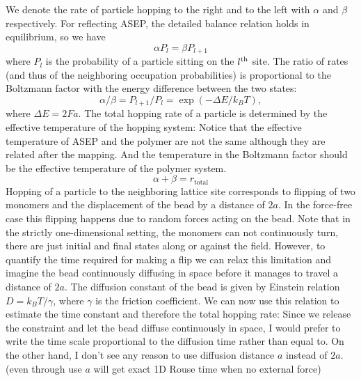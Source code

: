 \documentclass[aps,showpacs,twocolumn,floatfix,prx,superscriptaddress]{revtex4-1}
\begin{document}
We denote the rate of particle hopping to the right and to the left with $\alpha$ and $\beta$ respectively. For reflecting ASEP, the detailed balance relation holds in equilibrium, so we have 
\begin{equation}
    \alpha P_{l} = \beta P_{l+1} \label{eq:db}
\end{equation}
where $P_{l}$ is the probability of a particle sitting on the $l^{\rm{th}}$ site. The ratio of rates (and thus of the neighboring occupation probabilities) is proportional to the Boltzmann factor with the energy difference between the two states:
\begin{equation}
    \alpha / \beta = P_{l+1} / P_{l} = \exp{(-\Delta E / k_B T)},  \label{eq:r_divide_l}
\end{equation}
where  $\Delta E = 2Fa$.  The total hopping rate of a particle is determined by the effective temperature of the hopping system: {\color{red} Notice that the effective temperature of ASEP and the polymer are not the same although they are related after the mapping. And the temperature in the Boltzmann factor should be the effective temperature of the polymer system.}
\begin{equation}
    \alpha + \beta = r_{\text{total}} \label{eq:l_plus_r}
\end{equation}
Hopping of a particle to the neighboring lattice site corresponds to flipping of two monomers and the displacement of the bead by a distance of $2a$. In the force-free case this flipping happens due to random forces acting on the bead. Note that in the strictly one-dimensional setting, the monomers can not continuously turn, there are just initial and final states along or against the field. However, to quantify the time required for making a flip we can relax this limitation and imagine the bead continuously diffusing in space before it manages to travel a distance of $2a$. The diffusion constant of the bead is given by Einstein relation $D=k_{B}T/\gamma$, where $\gamma$ is the friction coefficient.
We can now use this relation to estimate the time constant and therefore the total hopping rate:
{\color{red} Since we release the constraint and let the bead diffuse continuously in space, I would prefer to write the time scale proportional to the diffusion time rather than equal to. On the other hand, I don't see any reason to use diffusion distance $a$ instead of $2a$. (even through use $a$ will get exact 1D Rouse time when no external force)}
\end{document}
